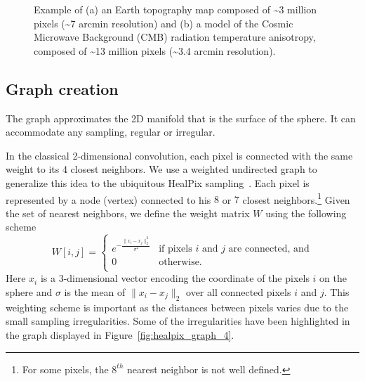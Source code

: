 \documentclass[final,twocolumn,3p,times,authoryear]{elsarticle}
\newcommand{\nati}[1]{{\color[rgb]{.1,.6,.1}{#1}}}
\newcommand{\todo}[1]{{\color[rgb]{.6,.1,.6}{#1}}}
\newcommand{\figref}[1]{Figure~\ref{fig:#1}}
\newcommand{\1}{\b{1}}              %
\newcommand{\0}{\b{0}}              %
\begin{document}
\begin{figure}[ht]
\begin{subfigure}[b]{0.45\linewidth}
		\caption{}
		\label{fig:example_cmb}
	\end{subfigure}
	\caption[]{Example of (a) an Earth topography map composed of \textasciitilde 3 million pixels (\textasciitilde 7 arcmin resolution) and (b) a model of the Cosmic Microwave Background (CMB) radiation temperature anisotropy, composed of \textasciitilde 13 million pixels (\textasciitilde 3.4 arcmin resolution).\footnotemark}
	\label{fig:example_maps}
\end{figure}


\subsection{Graph creation}

The graph approximates the 2D manifold that is the surface of the sphere. It can accommodate any sampling, regular or irregular.

In the classical 2-dimensional convolution, each pixel is connected with the
same weight to its 4 closest neighbors. We use a weighted undirected graph to
generalize this idea to the ubiquitous HealPix
sampling~\citep{gorski2005healpix}.  Each pixel is represented by a node
(vertex) connected to his $8$ or $7$ closest neighbors.\footnote{For some
pixels, the $8^{th}$ nearest neighbor is not well defined.} Given the set of
nearest neighbors, we define the weight matrix $W$ using the following scheme
\begin{equation}
W[i,j]=\begin{cases}
e^{-\frac{\|x_i-x_j\|_2^2}{\sigma^2}} & \text{if pixels $i$ and $j$ are connected, and}\\
0 & \text{otherwise.}\\
\end{cases}
\end{equation}
\todo{why not $1/d$? See Pascal's paper, \nati{ The question is: is $1/d$ also good when we have 7/8 neighboors instead of 4? Practically, we can also use $1/d$, but that means changing the code and re-runing the experiment. We probably do not have to change any parameter though... @mdeff: do you think we should try this for this paper? Or we keep that for the next one.}}
Here $x_i$ is a 3-dimensional vector encoding the coordinate of the pixels $i$
on the sphere and $\sigma$ is the mean of $\|x_i-x_j\|_2$ over all connected
pixels $i$ and $j$. This weighting scheme is important as the distances between
pixels varies due to the small sampling irregularities. Some of the
irregularities have been highlighted in the graph displayed in
\figref{healpix_graph_4}.
\end{document}
